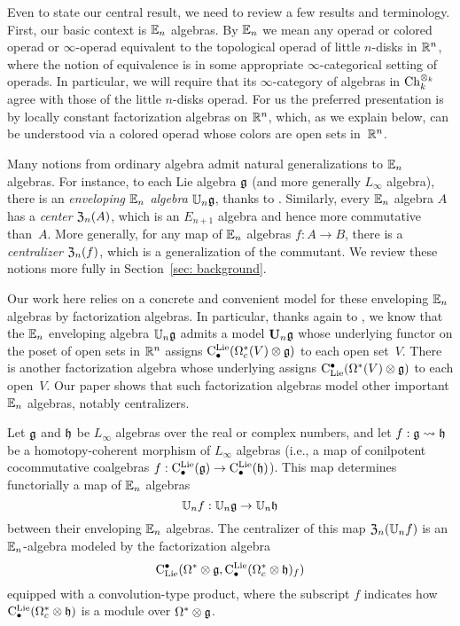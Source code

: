 \documentclass[11pt]{amsart}
\numberwithin{equation}{section}
\def\owen{\textcolor{magenta}{OG: }\textcolor{magenta}}
\begin{document}

Even to state our central result, we need to review a few results and terminology.
First, our basic context is $\mathbb E_n$ algebras.
By $\mathbb E_n$ we mean any operad or colored operad or $\infty$-operad equivalent to the topological operad of little $n$-disks in $\mathbb R^n$, where the notion of equivalence is in some appropriate $\infty$-categorical setting of operads. 
In particular, we will require that its $\infty$-category of algebras in ${\rm Ch}_k^{\otimes_k}$ agree with those of the little $n$-disks operad. 
For us the preferred presentation is by locally constant factorization algebras on $\mathbb R^n$,
which, as we explain below, can be understood via a colored operad whose colors are open sets in~$\mathbb R^n$.

Many notions from ordinary algebra admit natural generalizations to $\mathbb E_n$ algebras.
For instance, to each Lie algebra $\mathfrak g$ (and more generally $L_\infty$ algebra),
there is an {\em enveloping $\mathbb E_n$ algebra} $\mathbb U_n \mathfrak g$, thanks to \cite{Knudsen}.
Similarly, every $\mathbb E_n$ algebra $A$ has a {\em center} ${\frak Z}_n(A)$, which is an $E_{n+1}$ algebra and hence more commutative than~$A$.
More generally, for any map of $\mathbb E_n$ algebras $f: A \to B$, there is a {\em centralizer} ${\frak Z}_n(f)$, 
which is a generalization of the commutant.
We review these notions more fully in Section~\ref{sec: background}.

Our work here relies on a concrete and convenient model for these enveloping $\mathbb E_n$ algebras by factorization algebras.
In particular, thanks again to \cite{Knudsen}, 
we know that the $\mathbb E_n$ enveloping algebra $\mathbb U_n \mathfrak g$ admits a model $\mathbf U_n \mathfrak g$ whose underlying functor on the poset of open sets in $\mathbb R^n$ assigns ${\rm C}^{\rm Lie}_\bullet(\Omega_c^*(V) \otimes \mathfrak g)$ to each open set~$V$.
There is another factorization algebra whose underlying assigns ${\rm C}_{\rm Lie}^\bullet(\Omega^*(V) \otimes \mathfrak g)$ to each open~$V$.
Our paper shows that such factorization algebras model other important $\mathbb E_n$ algebras, notably centralizers.

\begin{thm}
\label{thm: centralizer}
Let $\mathfrak g$ and $\mathfrak h$ be $L_\infty$ algebras over the real or complex numbers, 
and let $f: \mathfrak g \rightsquigarrow \mathfrak h$ be a homotopy-coherent morphism of $L_\infty$ algebras
(i.e., a map of conilpotent cocommutative coalgebras $f: {\rm C}^{\rm Lie}_\bullet(\mathfrak g) \to {\rm C}^{\rm Lie}_\bullet(\mathfrak h)$).
This map determines functorially a map of $\mathbb E_n$ algebras
\[
\mathbb U_n f: \mathbb U_n \mathfrak g \to \mathbb U_n \mathfrak h
\]
between their enveloping $\mathbb E_n$ algebras.
The centralizer of this map ${\frak Z}_n(\mathbb U_n f)$ is an $\mathbb E_n$-algebra modeled by the factorization algebra 
\[
{\rm C}_{\rm Lie}^\bullet(\Omega^* \otimes \mathfrak g, {\rm C}^{\rm Lie}_\bullet(\Omega^*_c \otimes \mathfrak h)_f)
\]
equipped with a convolution-type product,
where the subscript $f$ indicates how ${\rm C}^{\rm Lie}_\bullet(\Omega^*_c \otimes \mathfrak h)$ is a module over $\Omega^* \otimes \mathfrak g$.
\end{thm}
\end{document}
